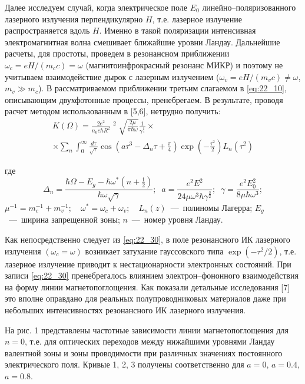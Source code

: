 {Далее исследуем случай, когда электрическое поле $E_{0} $ линейно--поляризованного лазерного излучения перпендикулярно $H$, т.е. лазерное излучение распространяется вдоль $H$. Именно в такой поляризации интенсивная электромагнитная волна смешивает ближайшие уровни Ландау. Дальнейшие расчеты, для простоты, проведем в резонансном приближении $\omega _{c} =eH/(m_{c} c)=\omega $ (магнитоинфрокрасный резонанс МИКР) и поэтому не учитываем взаимодействие дырок с лазерным излучением ($\omega _{v} =eH/(m_{v} c)\ne \omega $, $m_{v} \gg m_{c} $). В рассматриваемом приближении третьим слагаемом в \eqref{eq:22_10}, описывающим двухфотонные процессы, пренебрегаем. В результате, проводя расчет методом использованным в \cite{Sinyavskii1974,Sinyavskii2002}[5,6], нетрудно получить: 
\begin{multline} \label{eq:22_30} 
K(\Omega )=\frac{2e^{2} }{n_{0} c\hbar R^{2} } \mathop{\left|\frac{p_{cv} \xi _{0} }{m_{0} } \right|}\nolimits^{2} \sqrt{\frac{2\mu }{\pi \hbar \omega } } \frac{1}{\gamma ^{{\tfrac{1}{4}} } } \times \\
\times \sum _{n} \int _{0}^{\infty } \frac{d\tau }{\sqrt{\tau } } \cos \left(a\tau ^{3} -\Delta _{n} \tau +\frac{\pi }{4} \right)\exp \left(-\frac{\tau ^{2} }{2} \right)L_{n} (\tau ^{2} )
\end{multline} 

где 
\[
\Delta _{n} =\frac{\hbar \Omega -E_{g} -\hbar \omega ^{*} \left(n+{\tfrac{1}{2}} \right)}{\hbar \omega \sqrt{\gamma } } ;\; \; a=\frac{e^{2} E^{2} }{24\mu \omega ^{3} \hbar \gamma ^{{\tfrac{3}{2}} } } ;\; \; \gamma =\frac{e^{2} E_{0}^{2} }{8\mu \hbar \omega ^{3} } ;
\] 
$\mu ^{-1} =m_{c}^{-1} +m_{v}^{-1} ;$~~$\omega ^{*} =\omega _{c} +\omega _{v} ;$~~$L_{n} (z)$~---~полиномы Лагерра; $E_{g} $~---~ширина запрещенной зоны; $n$~---~номер уровня Ландау. 

\noindent Как непосредственно следует из \eqref{eq:22_30}, в поле резонансного ИК лазерного излучения $(\omega _{c} =\omega )$ возникает затухание гауссовского типа $\exp \left(-\tau ^{2} /2\right)$, т.е. лазерное излучение приводит к нестационарности электронных состояний. При записи \eqref{eq:22_30} пренебрегалось влиянием электрон--фононного взаимодействия на форму линии магнетопоглощения. Как показали детальные исследования \cite{Sinyavskii1976}[7] это вполне оправдано для реальных полупроводниковых материалов даже при небольших интенсивностях резонансного ИК лазерного излучения. 

На рис. 1 представлены частотные зависимости линии магнетопоглощения для $n=0$, т.е. для оптических переходов между нижайшими уровнями Ландау валентной зоны и зоны проводимости при различных значениях постоянного электрического поля. Кривые 1, 2, 3 получены соответственно для $a=0$, $a=0.4$, $a=0.8$.

}

